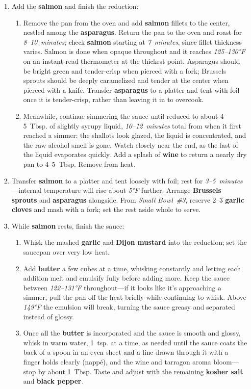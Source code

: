 \documentclass[11pt,letterpaper]{article}
\begin{document}
\begin{enumerate}
    \item Add the \textbf{salmon} and finish the reduction:
    \begin{enumerate}
        \item Remove the pan from the oven and add \textbf{salmon} fillets to the center, nestled among the \textbf{asparagus}. Return the pan to the oven and roast for \textit{8--10~minutes}; check \textbf{salmon} starting at \textit{7~minutes}, since fillet thickness varies. Salmon is done when opaque throughout and it reaches \textit{125--130°F} on an instant-read thermometer at the thickest point. Asparagus should be bright green and tender-crisp when pierced with a fork; Brussels sprouts should be deeply caramelized and tender at the center when pierced with a knife. Transfer \textbf{asparagus} to a platter and tent with foil once it is tender-crisp, rather than leaving it in to overcook.
        \item Meanwhile, continue simmering the sauce until reduced to about 4--5~Tbsp. of slightly syrupy liquid, \textit{10--12~minutes} total from when it first reached a simmer: the shallots look glazed, the liquid is concentrated, and the raw alcohol smell is gone. Watch closely near the end, as the last of the liquid evaporates quickly. Add a splash of \textbf{wine} to return a nearly dry pan to 4--5~Tbsp. Remove from heat.
    \end{enumerate}

    \item Transfer \textbf{salmon} to a platter and tent loosely with foil; rest for \textit{3--5~minutes}---internal temperature will rise about \textit{5°F} further. Arrange \textbf{Brussels sprouts} and \textbf{asparagus} alongside. From \textit{Small Bowl~\#3}, reserve 2--3 \textbf{garlic cloves} and mash with a fork; set the rest aside whole to serve.

    \item While \textbf{salmon} rests, finish the sauce:
    \begin{enumerate}
        \item Whisk the mashed \textbf{garlic} and \textbf{Dijon mustard} into the reduction; set the saucepan over very low heat.
        \item Add \textbf{butter} a few cubes at a time, whisking constantly and letting each addition melt and emulsify fully before adding more. Keep the sauce between \textit{122--131°F} throughout---if it looks like it's approaching a simmer, pull the pan off the heat briefly while continuing to whisk. Above \textit{149°F} the emulsion will break, turning the sauce greasy and separated instead of glossy.
        \item Once all the \textbf{butter} is incorporated and the sauce is smooth and glossy, whisk in warm water, 1~tsp. at a time, as needed until the sauce coats the back of a spoon in an even sheet and a line drawn through it with a finger holds clearly (napp\'{e}), and the wine and tarragon aroma bloom---stop by about 1~Tbsp. Taste and adjust with the remaining \textbf{kosher salt} and \textbf{black pepper}.
    \end{enumerate}


\end{enumerate}
\end{document}
